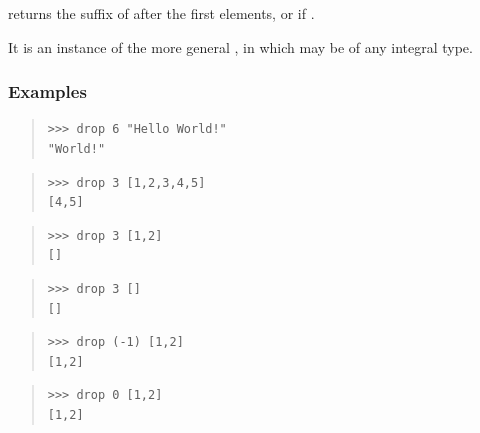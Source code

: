 \begin{haddockdesc}
\item[\begin{tabular}{@{}l}
drop :: Int -> {\char 91}a{\char 93} -> {\char 91}a{\char 93}
\end{tabular}]
{\haddockbegindoc
{}  returns the suffix of 
 after the first  elements, or  if .\par
It is an instance of the more general ,
 in which  may be of any integral type.\par
\subsubsection*{\textbf{Examples}}
\begin{quote}
{\haddockverb\begin{verbatim}
>>> drop 6 "Hello World!"
"World!"

\end{verbatim}}
\end{quote}
\begin{quote}
{\haddockverb\begin{verbatim}
>>> drop 3 [1,2,3,4,5]
[4,5]

\end{verbatim}}
\end{quote}
\begin{quote}
{\haddockverb\begin{verbatim}
>>> drop 3 [1,2]
[]

\end{verbatim}}
\end{quote}
\begin{quote}
{\haddockverb\begin{verbatim}
>>> drop 3 []
[]

\end{verbatim}}
\end{quote}
\begin{quote}
{\haddockverb\begin{verbatim}
>>> drop (-1) [1,2]
[1,2]

\end{verbatim}}
\end{quote}
\begin{quote}
{\haddockverb\begin{verbatim}
>>> drop 0 [1,2]
[1,2]

\end{verbatim}}
\end{quote}}
\end{haddockdesc}
